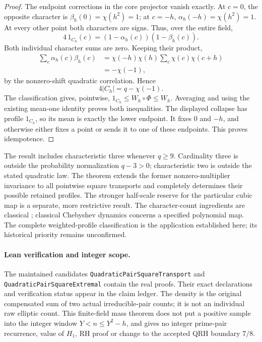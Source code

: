 \documentclass[11pt]{article}
\begin{document}
\begin{proof}
The endpoint corrections in the core projector vanish exactly.
At \(c=0\), the opposite character is
\(\beta_h(0)=\chi(h^2)=1\); at \(c=-h\),
\(\alpha_h(-h)=\chi(h^2)=1\). At every other point both
characters are signs. Thus, over the entire field,
\[
 4\,1_{C_h}(c)=(1-\alpha_h(c))(1-\beta_h(c)).
\]
Both individual character sums are zero. Keeping their product,
\[
 \begin{split}
 \sum_c\alpha_h(c)\beta_h(c)
 &=\chi(-h)\chi(h)\sum_c\chi(c)\chi(c+h)\\
 &=-\chi(-1),
 \end{split}
\]
by the nonzero-shift quadratic correlation. Hence
\[
                         4|C_h|=q-\chi(-1).
\]
The classification gives, pointwise,
\(1_{C_h}\le W_h\circ\Phi\le W_h\).
Averaging and using the existing mean-one identity proves both
inequalities. The displayed collapse has profile \(1_{C_h}\),
so its mean is exactly the lower endpoint. It fixes \(0\) and
\(-h\), and otherwise either fixes a point or sends it to one
of these endpoints. This proves idempotence.
\end{proof}

The result includes characteristic three whenever \(q\ge9\).
Cardinality three is outside the probability normalization
\(q-3>0\); characteristic two is outside the stated quadratic law.
The theorem extends the former nonzero-multiplier invariance to
all pointwise square transports and completely determines their
possible retained profiles. The stronger half-scale reserve for
the particular cubic map is a separate, more restrictive result.
The character-count ingredients are classical
\cite{CohenConsecutivePatterns}; classical Chebyshev dynamics
\cite{GassertChebyshevGraphs} concerns a specified polynomial map.
The complete weighted-profile classification is the application
established here; its historical priority remains unconfirmed.

\paragraph{Lean verification and integer scope.}
The maintained candidates
\texttt{QuadraticPairSquareTransport} and
\texttt{QuadraticPairSquareExtremal} contain the real proofs.
Their exact declarations and verification status appear in the
claim ledger. The density is the original compensated sum of two
actual irreducible-pair counts; it is not an individual raw elliptic
count. This finite-field mass theorem does not put a positive
sample into the integer window \(Y<n\le Y^2-h\), and gives no
integer prime-pair recurrence, value of \(H_1\), RH proof or change
to the accepted QRH boundary \(7/8\).
\end{document}
